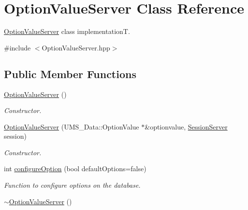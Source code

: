 \hypertarget{classOptionValueServer}{
\section{OptionValueServer Class Reference}
\label{classOptionValueServer}
}


\hyperlink{classOptionValueServer}{OptionValueServer} class implementationT.  




{\ttfamily \#include $<$OptionValueServer.hpp$>$}

\subsection*{Public Member Functions}
\begin{DoxyCompactItemize}
\item 
\hypertarget{classOptionValueServer_a8a72322eb8f598eb671f3c80265379e9}{
\hyperlink{classOptionValueServer_a8a72322eb8f598eb671f3c80265379e9}{OptionValueServer} ()}
\label{classOptionValueServer_a8a72322eb8f598eb671f3c80265379e9}

\begin{DoxyCompactList}\small\item\em Constructor. \item\end{DoxyCompactList}\item 
\hyperlink{classOptionValueServer_a2f432257cbe83451b54d59c584cc35c6}{OptionValueServer} (UMS\_\-Data::OptionValue $\ast$\&optionvalue, \hyperlink{classSessionServer}{SessionServer} session)
\begin{DoxyCompactList}\small\item\em Constructor. \item\end{DoxyCompactList}\item 
int \hyperlink{classOptionValueServer_afe5c33ad15ac74fe72690c8d54302729}{configureOption} (bool defaultOptions=false)
\begin{DoxyCompactList}\small\item\em Function to configure options on the database. \item\end{DoxyCompactList}\item 
\hypertarget{classOptionValueServer_ac302d5f497a13eabd1bbeea9c3b124d8}{
\hyperlink{classOptionValueServer_ac302d5f497a13eabd1bbeea9c3b124d8}{$\sim$OptionValueServer} ()}
\label{classOptionValueServer_ac302d5f497a13eabd1bbeea9c3b124d8}


\end{DoxyCompactItemize}
